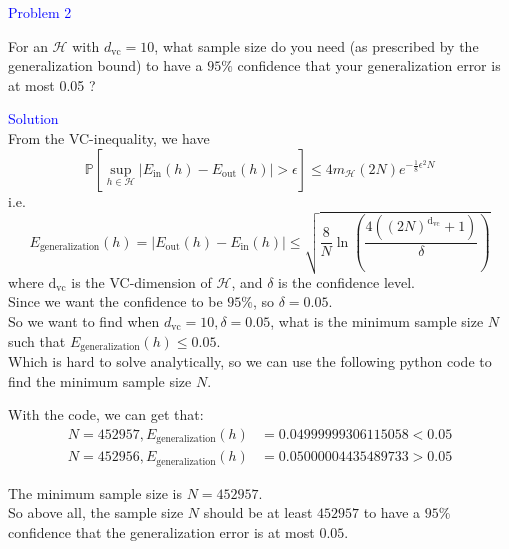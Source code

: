 \textcolor{blue}{Problem 2}

For an $\mathcal{H}$ with $d_{\mathrm{vc}}=10$, what sample size do you need (as prescribed by the generalization bound) to have a $95 \%$ confidence that your generalization error is at most 0.05 ?

\textcolor{blue}{Solution}\\

From the VC-inequality, we have
$$\mathbb{P}\left[\sup_{h\in\mathcal{H}}\left|E_{\text{in}}(h)-E_{\text{out}}(h)\right|>\epsilon\right]\leq 4m_{\mathcal{H}}(2N)e^{-\frac{1}{8}\epsilon^2N}$$
i.e.
$$E_{\text{generalization}}(h) = \left|E_{\text{out}}(h) - E_{\text{in}}(h)\right| \leq \sqrt{\dfrac{8}{N}\ln\left(\dfrac{4((2N)^{\text{d}_{\text{vc}}}+1)}{\delta}\right)}$$
where $\text{d}_{\text{vc}}$ is the VC-dimension of $\mathcal{H}$, and $\delta$ is the confidence level.\\
Since we want the confidence to be $95\%$, so $\delta=0.05$.\\
So we want to find when $d_{\mathrm{vc}}=10, \delta=0.05$, what is the minimum sample size $N$ such that $E_{\text{generalization}}(h)\leq 0.05$.\\
Which is hard to solve analytically, so we can use the following python code to find the minimum sample size $N$.


With the code, we can get that:
\begin{align*}
    N = 452957, E_{\text{generalization}}(h) &= 0.04999999306115058 < 0.05\\
    N = 452956, E_{\text{generalization}}(h) &= 0.05000004435489733 > 0.05
\end{align*}

The minimum sample size is $N=452957$.\\
So above all, the sample size $N$ should be at least $452957$ to have a $95\%$ confidence that the generalization error is at most $0.05$.\\

\newpage